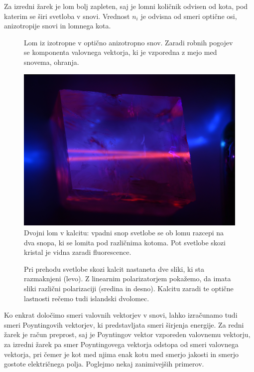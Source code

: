 Za izredni žarek je lom bolj zapleten, saj je lomni količnik odvisen od kota, pod
katerim se širi svetloba v snovi. 
Vrednost $n_i$ je odvisna od smeri optične osi, anizotropije snovi in lomnega kota.
\begin{figure}[h]
\centering
\def\svgwidth{70truemm} 

\caption{Lom iz izotropne v optično anizotropno snov. Zaradi robnih pogojev se
komponenta valovnega vektorja, ki je vzporedna z mejo med snovema, ohranja. }
\label{fig:10_dvolom_1}
\end{figure}
\begin{figure}[ht]
\centering
\includegraphics[width=9truecm]{slike/10_FotoDvolom2.jpg}
\caption{Dvojni lom v kalcitu: vpadni snop svetlobe se ob lomu 
razcepi na dva snopa, ki se lomita pod različnima kotoma.
Pot svetlobe skozi kristal je vidna zaradi fluorescence.}
\label{fig:10_dvolom_2}
\end{figure}
\begin{figure}[h!]
\centering
\def\svgwidth{140truemm} 

\caption{Pri prehodu svetlobe skozi kalcit nastaneta dve sliki, ki sta razmaknjeni (levo). 
Z linearnim polarizatorjem pokažemo, da imata sliki različni polarizaciji (sredina in desno). 
Kalcitu zaradi te optične lastnosti rečemo tudi islandski dvolomec.
}
\label{fig:10_dvolom_2}
\end{figure}

Ko enkrat določimo smeri valovnih vektorjev v snovi, lahko izračunamo tudi 
smeri Poyntingovih vektorjev, ki predstavljata smeri širjenja energije. Za redni 
žarek je račun preprost, saj je Poyntingov vektor vzporeden valovnemu vektorju, za 
izredni žarek pa smer Poyntingovega vektorja odstopa od smeri valovnega vektorja, pri 
čemer je kot med njima enak kotu med smerjo jakosti in smerjo gostote električnega polja. 
Poglejmo nekaj zanimivejših primerov.

